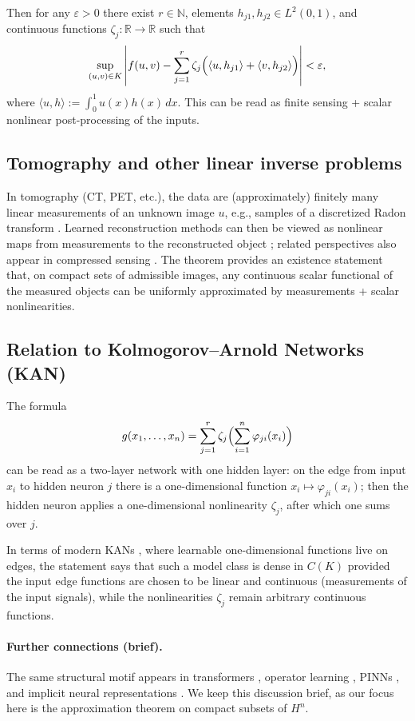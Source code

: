 \documentclass[final,12pt]{colt2026} %
\begin{document}
Then for any $\varepsilon>0$ there exist $r\in\mathbb{N}$, elements $h_{j1},h_{j2}\in L^2(0,1)$, and continuous functions $\zeta_j\colon\mathbb{R}\to\mathbb{R}$ such that
\[
  \sup_{(u,v)\in K}\left|f(u,v)-\sum_{j=1}^r \zeta_j\Bigl(\langle u,h_{j1}\rangle+\langle v,h_{j2}\rangle\Bigr)\right|<\varepsilon,
\]
where $\langle u,h\rangle:=\int_0^1 u(x)h(x)\,dx$. This can be read as finite sensing + scalar nonlinear post-processing of the inputs.

\subsection{Tomography and other linear inverse problems}
In tomography (CT, PET, etc.), the data are (approximately) finitely many linear measurements of an unknown image $u$, e.g., samples of a discretized Radon transform \cite{natterer_ct}. Learned reconstruction methods can then be viewed as nonlinear maps from measurements to the reconstructed object \cite{adler_oktem_learned}; related perspectives also appear in compressed sensing \cite{candes_cs}. The theorem provides an existence statement that, on compact sets of admissible images, any continuous scalar functional of the measured objects can be uniformly approximated by measurements + scalar nonlinearities.

\subsection{Relation to Kolmogorov--Arnold Networks (KAN)}
The formula
\[
  g(x_1,\dots,x_n)=\sum_{j=1}^r \zeta_j\Bigl(\sum_{i=1}^n \varphi_{ji}(x_i)\Bigr)
\]
can be read as a two-layer network with one hidden layer: on the edge from input $x_i$ to hidden neuron $j$ there is a one-dimensional function $x_i\mapsto \varphi_{ji}(x_i)$; then the hidden neuron applies a one-dimensional nonlinearity $\zeta_j$, after which one sums over $j$.

In terms of modern KANs \cite{liu_kan}, where learnable one-dimensional functions live on edges, the statement says that such a model class is dense in $C(K)$ provided the input edge functions are chosen to be linear and continuous (measurements of the input signals), while the nonlinearities $\zeta_j$ remain arbitrary continuous functions.

\paragraph{Further connections (brief).}
The same structural motif appears in transformers \cite{vaswani_transformer}, operator learning \cite{kovachki_neuraloperator,li_fno,lu_deeponet}, PINNs \cite{raissi_pinn}, and implicit neural representations \cite{sitzmann_siren,mildenhall_nerf}. We keep this discussion brief, as our focus here is the approximation theorem on compact subsets of $H^n$.
\end{document}
